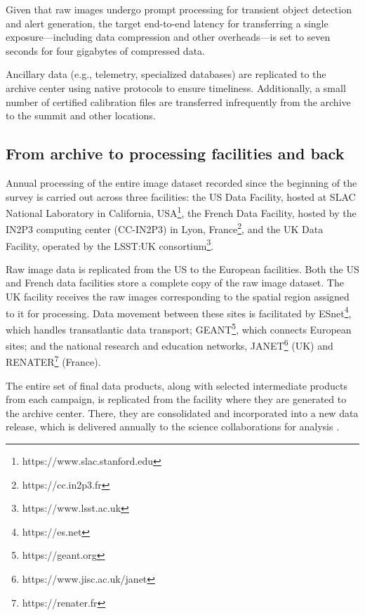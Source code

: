 \documentclass{webofc}
\begin{document}
Given that raw images undergo prompt processing for transient object detection and alert generation, the target end-to-end latency for transferring a single exposure—including data compression and other overheads—is set to seven seconds for four gigabytes of compressed data.

Ancillary data (e.g., telemetry, specialized databases) are replicated to the archive center using native protocols to ensure timeliness. Additionally, a small number of certified calibration files are transferred infrequently from the archive to the summit and other locations.

\subsection{From archive to processing facilities and back}
\label{summit-to-data-facilities}

Annual processing of the entire image dataset recorded since the beginning of the survey is carried out across three facilities: the US Data Facility, hosted at SLAC National Laboratory in California, USA\footnote{https://www.slac.stanford.edu}, the French Data Facility, hosted by the IN2P3 computing center (CC-IN2P3) in Lyon, France\footnote{https://cc.in2p3.fr}, and the UK Data Facility, operated by the LSST:UK consortium\footnote{https://www.lsst.ac.uk}.

Raw image data is replicated from the US to the European facilities. Both the US and French data facilities store a complete copy of the raw image dataset. The UK facility receives the raw images corresponding to the spatial region assigned to it for processing. Data movement between these sites is facilitated by ESnet\footnote{https://es.net}, which handles transatlantic data transport; GEANT\footnote{https://geant.org}, which connects European sites; and the national research and education networks, JANET\footnote{https://www.jisc.ac.uk/janet} (UK) and RENATER\footnote{https://renater.fr} (France).

The entire set of final data products, along with selected intermediate products from each campaign, is replicated from the facility where they are generated to the archive center. There, they are consolidated and incorporated into a new data release, which is delivered annually to the science collaborations for analysis \cite{10.1051_epjconf_202429501042}.
\end{document}
